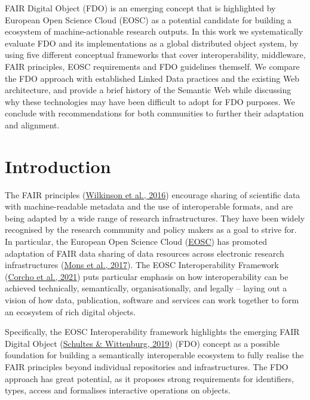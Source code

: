 FAIR Digital Object (FDO) is an emerging concept that is highlighted by European Open Science Cloud (EOSC) as a potential candidate for building a ecosystem of machine-actionable research outputs. In this work we systematically evaluate FDO and its implementations as a global distributed object system, by using five different conceptual frameworks that cover interoperability, middleware, FAIR principles, EOSC requirements and FDO guidelines themself. We compare the FDO approach with established Linked Data practices and the existing Web architecture, and provide a brief history of the Semantic Web while discussing why these technologies may have been difficult to adopt for FDO purposes. We conclude with recommendations for both communities to further their adaptation and alignment.

\hypertarget{sec:introduction}{%
\section{Introduction}\label{sec:introduction}}

The FAIR principles (\protect\hyperlink{ref-6DjakjNS}{Wilkinson et al., 2016}) encourage sharing of scientific data with machine-readable metadata and the use of interoperable formats, and are being adapted by a wide range of research infrastructures. They have been widely recognised by the research community and policy makers as a goal to strive for. In particular, the European Open Science Cloud (\href{https://www.eosc.eu/}{EOSC}) has promoted adaptation of FAIR data sharing of data resources across electronic research infrastructures (\protect\hyperlink{ref-u8Cy0psL}{Mons et al., 2017}). The EOSC Interoperability Framework (\protect\hyperlink{ref-aCye3KpE}{Corcho et al., 2021}) puts particular emphasis on how interoperability can be achieved technically, semantically, organisationally, and legally -- laying out a vision of how data, publication, software and services can work together to form an ecosystem of rich digital objects.

Specifically, the EOSC Interoperability framework highlights the emerging FAIR Digital Object (\protect\hyperlink{ref-IHLT6hye}{Schultes \& Wittenburg, 2019}) (FDO) concept as a possible foundation for building a semantically interoperable ecosystem to fully realise the FAIR principles beyond individual repositories and infrastructures. The FDO approach has great potential, as it proposes strong requirements for identifiers, types, access and formalises interactive operations on objects.

